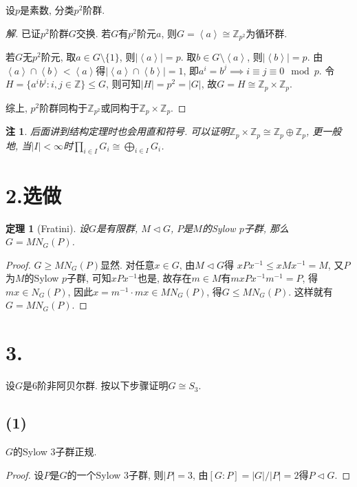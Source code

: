 \documentclass[12pt, a4paper, fontset=windows]{ctexart}
\newcommand{\Z}{\mathbb{Z}}
\newcommand{\abs}[1]{\left|{#1}\right|}
\newcommand{\gen}[1]{\left\langle{#1}\right\rangle}
\newcommand{\isom}{\cong} %
\newcommand{\xuan}{{\normalsize 选做}}
\newtheorem*{remark}{注}
\newtheorem*{theorem}{定理}
\newenvironment{solution}{\begin{proof}[解]}{\end{proof}}
\begin{document}
设$p$是素数, 分类$p^2$阶群. 

\begin{solution}
已证$p^2$阶群$G$交换. 若$G$有$p^2$阶元$a$, 则$G=\gen{a}\isom\Z_{p^2}$为循环群. 

若$G$无$p^2$阶元, 取$a\in G\setminus\{1\}$, 则$\abs{\gen{a}}=p$. 
取$b\in G\setminus\gen{a}$, 则$\abs{\gen{b}}=p$. 由
$\gen{a}\cap\gen{b}<\gen{a}$得$\abs{\gen{a}\cap\gen{b}}=1$, 
即$a^i=b^j\implies i\equiv j\equiv 0\mod{p}$. 
令$H=\{a^ib^j:i,j\in\Z\}\le G$, 则可知$\abs{H}=p^2=\abs{G}$, 
故$G=H\isom\Z_p\times\Z_p$. 

综上, $p^2$阶群同构于$\Z_{p^2}$或同构于$\Z_p\times\Z_p$. 
\end{solution}

\begin{remark}
后面讲到结构定理时也会用直和符号. 可以证明$\Z_p\times\Z_p\isom\Z_p\oplus\Z_p$, 
更一般地, 当$\abs{I}<\infty$时$\prod_{i\in I}G_i\isom\bigoplus_{i\in I}G_i$. 
\end{remark}

\section*{2.\xuan}

\begin{theorem}[Fratini]
设$G$是有限群, $M\lhd G$, $P$是$M$的Sylow $p$子群, 那么$G=MN_G(P)$. 
\end{theorem}

\begin{proof}
$G\ge MN_G(P)$显然. 对任意$x\in G$, 由$M\lhd G$得
$xPx^{-1}\le xMx^{-1}=M$, 又$P$为$M$的Sylow $p$子群, 
可知$xPx^{-1}$也是, 故存在$m\in M$有$mxPx^{-1}m^{-1}=P$, 
得$mx\in N_G(P)$, 因此$x=m^{-1}\cdot mx\in MN_G(P)$, 
得$G\le MN_G(P)$. 这样就有$G=MN_G(P)$. 
\end{proof}

\section*{3.}

设$G$是$6$阶非阿贝尔群. 按以下步骤证明$G\isom S_3$. 

\subsection*{(1)}

$G$的Sylow $3$子群正规. 

\begin{proof}
设$P$是$G$的一个Sylow $3$子群, 则$\abs{P}=3$, 
由$[G:P]=\abs{G}/\abs{P}=2$得$P\lhd G$. 
\end{proof}
\end{document}
